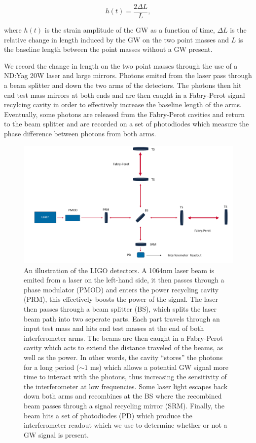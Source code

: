 \begin{equation}
    h(t) = \frac{2 \Delta L}{L},
\end{equation}

where $h(t)$ is the strain amplitude of the \ac{GW} 
as a function of time, $\Delta L$ is 
the relative change in length induced by the \ac{GW} on the two 
point masses and $L$ is the baseline length between the point 
masses without a \ac{GW} present. 

We record the change in length 
on the two point masses through the use of a ND:Yag 20W 
laser and large mirrors. Photons emited from the laser pass through a beam 
splitter and down the two arms of the detectors. The 
photons then hit end test mass mirrors at both ends 
and are then caught in a Fabry-Perot signal recylcing 
cavity in order to effectively increase the baseline 
length of the arms. Eventually, some photons are released 
from the Fabry-Perot cavities and return to the beam splitter 
and are recorded on a set of photodiodes which measure 
the phase difference between photons from both 
arms.

\begin{figure}
    \centering
    \includegraphics[width=\linewidth]{figures/Interferometer_sketch_figure.png}
    \caption[Illustration of the \ac{LIGO} detectors.]{An illustration of the \ac{LIGO} detectors. A 1064nm laser beam is emited from a laser on the left-hand side, it then passes through a phase modulator (PMOD) and enters the power recycling cavity (PRM), this effectively boosts the power of the signal. The laser then passes through a beam splitter (BS), which splits the laser beam path into two seperate parts. Each part travels through an input test mass and hits end test masses at the end of both interferometer arms. The beams are then caught in a Fabry-Perot cavity which acts to extend the distance traveled of the beams, as well as the power. In other words, the cavity ``stores'' the photons for a long period ($\sim1$ ms) which allows a potential \ac{GW} signal more time to interact with the photons, thus increasing the sensitivity of the interferometer at low frequencies. Some laser light escapes back down both arms and recombines at the BS where the recombined beam passes through a signal recycling mirror (SRM). Finally, the beam hits a set of photodiodes (PD) which produce the interferometer readout which we use to determine whether or not a \ac{GW} signal is present.}
    \label{fig:gw_plus_cross}
\end{figure}


